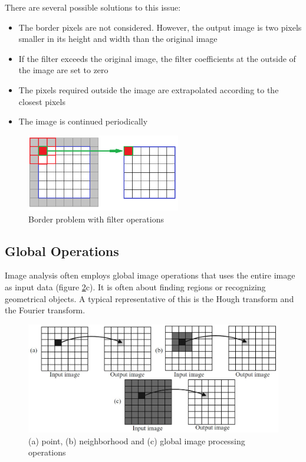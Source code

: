 There are several possible solutions to this issue:
\begin{itemize}
\item The border pixels are not considered. However, the output image is two
pixels smaller in its height and width than the original image
\item If the filter exceeds the original image, the filter coefficients
at the outside of the image are set to zero
\item The pixels required outside the image are extrapolated according to the closest pixels
\item The image is continued periodically
\end{itemize}
    
\begin{figure}[b!]
    \centering
    \includegraphics[width=0.6\textwidth]{images/theory/border_handling.png}
    \caption{Border problem with filter operations \cite{border_handling}}
    \label{fig:image_handling}
\end{figure}

\subsection{Global Operations}
Image analysis often employs global image operations that uses the entire image as input data (figure \ref{fig:image_operation}c). It is often about finding regions or recognizing geometrical objects. A typical representative of this is the Hough transform and the Fourier transform.
\begin{figure}[tb!]
    \centering
    \includegraphics[width=\textwidth]{images/theory/image_operations.jpg}
    \caption{(a) point, (b) neighborhood and (c) global image processing
    operations \cite{image_operation}}
    \label{fig:image_operation}
\end{figure}

